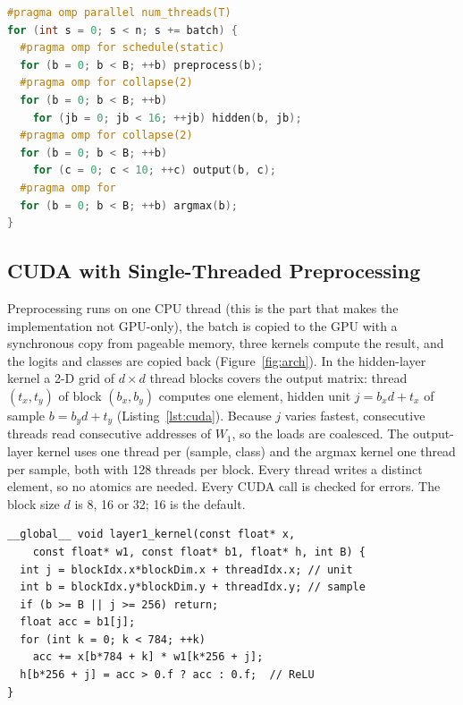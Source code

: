 \begin{lstlisting}[language=C++,caption={OpenMP region (simplified).},label={lst:omp}]
#pragma omp parallel num_threads(T)
for (int s = 0; s < n; s += batch) {
  #pragma omp for schedule(static)
  for (b = 0; b < B; ++b) preprocess(b);
  #pragma omp for collapse(2)
  for (b = 0; b < B; ++b)
    for (jb = 0; jb < 16; ++jb) hidden(b, jb);
  #pragma omp for collapse(2)
  for (b = 0; b < B; ++b)
    for (c = 0; c < 10; ++c) output(b, c);
  #pragma omp for
  for (b = 0; b < B; ++b) argmax(b);
}
\end{lstlisting}

\subsection{CUDA with Single-Threaded Preprocessing}
Preprocessing runs on one CPU thread (this is the part that makes the implementation not GPU-only), the batch is copied to the GPU with a synchronous copy from pageable memory, three kernels compute the result, and the logits and classes are copied back (Figure~\ref{fig:arch}). In the hidden-layer kernel a 2-D grid of $d\times d$ thread blocks covers the output matrix: thread $(t_x,t_y)$ of block $(b_x,b_y)$ computes one element, hidden unit $j=b_xd+t_x$ of sample $b=b_yd+t_y$ (Listing~\ref{lst:cuda}). Because $j$ varies fastest, consecutive threads read consecutive addresses of $W_1$, so the loads are coalesced. The output-layer kernel uses one thread per (sample, class) and the argmax kernel one thread per sample, both with 128 threads per block. Every thread writes a distinct element, so no atomics are needed. Every CUDA call is checked for errors. The block size $d$ is 8, 16 or 32; 16 is the default.

\begin{lstlisting}[language=CUDA,caption={Hidden-layer kernel.},label={lst:cuda}]
__global__ void layer1_kernel(const float* x,
    const float* w1, const float* b1, float* h, int B) {
  int j = blockIdx.x*blockDim.x + threadIdx.x; // unit
  int b = blockIdx.y*blockDim.y + threadIdx.y; // sample
  if (b >= B || j >= 256) return;
  float acc = b1[j];
  for (int k = 0; k < 784; ++k)
    acc += x[b*784 + k] * w1[k*256 + j];
  h[b*256 + j] = acc > 0.f ? acc : 0.f;  // ReLU
}
\end{lstlisting}


